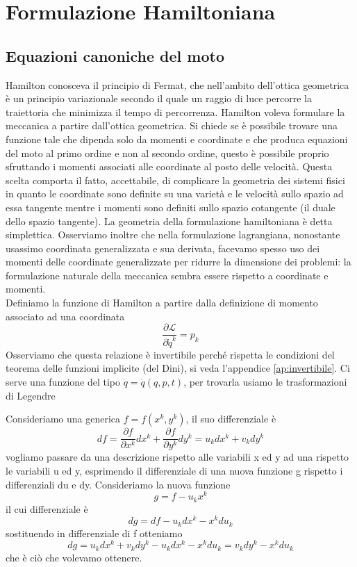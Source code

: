 \documentclass[
10pt, %
a4paper, %
oneside, %
headinclude,footinclude, %
BCOR5mm, %
]{scrartcl}
\begin{document}
\section{Formulazione Hamiltoniana}
\subsection{Equazioni canoniche del moto}
Hamilton conosceva il principio di Fermat, che nell'ambito dell'ottica geometrica è un principio variazionale secondo il quale un raggio di luce percorre la traiettoria che minimizza il tempo di percorrenza. Hamilton voleva formulare la meccanica a partire dall'ottica geometrica. Si chiede se è possibile trovare una funzione tale che dipenda solo da momenti e coordinate e che produca equazioni del moto al primo ordine e non al secondo ordine, questo è possibile proprio sfruttando i momenti associati alle coordinate al posto delle velocità. Questa scelta comporta il fatto, accettabile, di complicare la geometria dei sistemi fisici in quanto le coordinate sono definite su una varietà e le velocità sullo spazio ad essa tangente mentre i momenti sono definiti sullo spazio cotangente (il duale dello spazio tangente). La geometria della formulazione hamiltoniana è detta simplettica. Osserviamo inoltre che nella formulazione lagrangiana, nonostante usassimo coordinata generalizzata e sua derivata, facevamo spesso uso dei momenti delle coordinate generalizzate per ridurre la dimensione dei problemi: la formulazione naturale della meccanica sembra essere rispetto a coordinate e momenti.\\
Definiamo la funzione di Hamilton a partire dalla definizione di momento associato ad una coordinata
\[\frac{\partial \mathcal{L}}{\partial \dot{q}^k} = p_k\]
Osserviamo che questa relazione è invertibile perché rispetta le condizioni del teorema delle funzioni implicite (del Dini), si veda l'appendice \ref{ap:invertibile}. Ci serve una funzione del tipo $\dot{q} = \dot{q}(q, p, t)$, per trovarla usiamo le trasformazioni di Legendre
\begin{definizione}
	Consideriamo una generica \(f = f(x^k, y^k)\), il suo differenziale è
	\[df = \frac{\partial f}{\partial x^k}dx^k+\frac{\partial f}{\partial y^k}dy^k = u_kdx^k+v_kdy^k\]
	vogliamo passare da una descrizione rispetto alle variabili x ed y ad una rispetto le variabili u ed y, esprimendo il differenziale di una nuova funzione g rispetto i differenziali du e dy. Consideriamo la nuova funzione
	\[g = f-u_kx^k\]
	il cui differenziale è
	\[dg = df-u_kdx^k-x^kdu_k\]
	sostituendo in differenziale di f otteniamo
	\[dg = u_kdx^k+v_kdy^k-u_kdx^k-x^kdu_k = v_kdy^k-x^kdu_k\]
	che è ciò che volevamo ottenere.
\end{definizione}
\end{document}
